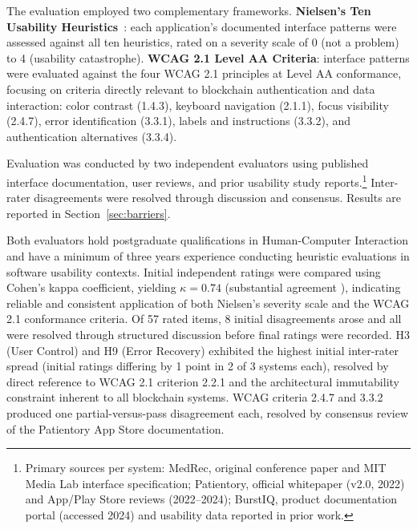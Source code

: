 \documentclass[journal,onecolumn]{IEEEtran}
\begin{document}
The evaluation employed two complementary frameworks. \textbf{Nielsen's Ten Usability Heuristics}~\cite{nielsen1994usability}: each application's documented interface patterns were assessed against all ten heuristics, rated on a severity scale of 0 (not a problem) to 4 (usability catastrophe). \textbf{WCAG 2.1 Level AA Criteria}: interface patterns were evaluated against the four WCAG 2.1 principles at Level AA conformance, focusing on criteria directly relevant to blockchain authentication and data interaction: color contrast (1.4.3), keyboard navigation (2.1.1), focus visibility (2.4.7), error identification (3.3.1), labels and instructions (3.3.2), and authentication alternatives (3.3.4).

Evaluation was conducted by two independent evaluators using published interface documentation, user reviews, and prior usability study reports.\footnote{Primary sources per system: MedRec, original conference paper and MIT Media Lab interface specification; Patientory, official whitepaper (v2.0, 2022) and App/Play Store reviews (2022--2024); BurstIQ, product documentation portal (accessed 2024) and usability data reported in prior work.} Inter-rater disagreements were resolved through discussion and consensus. Results are reported in Section~\ref{sec:barriers}.



Both evaluators hold postgraduate qualifications in Human-Computer Interaction and have a minimum of three years experience conducting heuristic evaluations in software usability contexts. Initial independent ratings were compared using Cohen's kappa coefficient, yielding $\kappa = 0.74$ (substantial agreement \cite{landis1977measurement}), indicating reliable and consistent application of both Nielsen's severity scale and the WCAG 2.1 conformance criteria. Of 57 rated items, 8 initial disagreements arose and all were resolved through structured discussion before final ratings were recorded. H3 (User Control) and H9 (Error Recovery) exhibited the highest initial inter-rater spread (initial ratings differing by 1 point in 2 of 3 systems each), resolved by direct reference to WCAG 2.1 criterion 2.2.1 and the architectural immutability constraint inherent to all blockchain systems. WCAG criteria 2.4.7 and 3.3.2 produced one partial-versus-pass disagreement each, resolved by consensus review of the Patientory App Store documentation.




\end{document}
